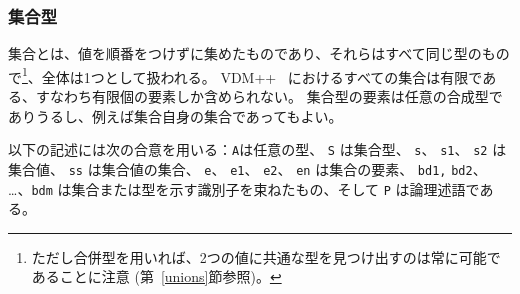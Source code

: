 \documentclass[\pformat,12pt]{jarticle}
\newcommand{\vdmslpp}[2]{%
#2
}
\newcommand{\vdmsl}{VDM-SL}
\newcommand{\vdmpp}{VDM++}
\begin{document}
\subsubsection{集合型}
\label{sets}

集合とは、値を順番をつけずに集めたものであり、それらはすべて同じ型のもので\footnote{ただし合併型を用いれば、2つの値に共通な型を見つけ出すのは常に可能であることに注意 (第~\ref{unions}節参照)。}、全体は1つとして扱われる。
\vdmslpp{\vdmsl}{\vdmpp}\ におけるすべての集合は有限である、すなわち有限個の要素しか含められない。 
集合型の要素は任意の合成型でありうるし、例えば集合自身の集合であってもよい。

以下の記述には次の合意を用いる：{\tt A}は任意の型、 {\tt S} は集合型、 {\tt s}、 {\tt s1}、 {\tt s2} は集合値、 {\tt ss} は集合値の集合、 {\tt e}、 {\tt e1}、 {\tt e2}、 {\tt en} は集合の要素、 {\tt bd1,} {\tt bd2}、 \ldots、{\tt bdm} は集合または型を示す識別子を束ねたもの、そして {\tt P} は論理述語である。
\end{document}
